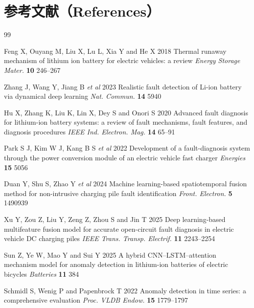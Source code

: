 \documentclass[12pt]{iopjournal}
\begin{document}

\section*{参考文献（References）}
\begingroup
\renewcommand{\section}[2]{}
\begin{thebibliography}{99}
\footnotesize
\setlength{\itemsep}{1pt}

 Feng X, Ouyang M, Liu X, Lu L, Xia Y and He X 2018 Thermal runaway mechanism of lithium ion battery for electric vehicles: a review \textit{Energy Storage Mater.} \textbf{10} 246--267

 Zhang J, Wang Y, Jiang B \textit{et al} 2023 Realistic fault detection of Li-ion battery via dynamical deep learning \textit{Nat. Commun.} \textbf{14} 5940

 Hu X, Zhang K, Liu K, Lin X, Dey S and Onori S 2020 Advanced fault diagnosis for lithium-ion battery systems: a review of fault mechanisms, fault features, and diagnosis procedures \textit{IEEE Ind. Electron. Mag.} \textbf{14} 65--91

 Park S J, Kim W J, Kang B S \textit{et al} 2022 Development of a fault-diagnosis system through the power conversion module of an electric vehicle fast charger \textit{Energies} \textbf{15} 5056

 Duan Y, Shu S, Zhao Y \textit{et al} 2024 Machine learning-based spatiotemporal fusion method for non-intrusive charging pile fault identification \textit{Front. Electron.} \textbf{5} 1490939

 Xu Y, Zou Z, Liu Y, Zeng Z, Zhou S and Jin T 2025 Deep learning-based multifeature fusion model for accurate open-circuit fault diagnosis in electric vehicle DC charging piles \textit{IEEE Trans. Transp. Electrif.} \textbf{11} 2243--2254

 Sun Z, Ye W, Mao Y and Sui Y 2025 A hybrid CNN--LSTM--attention mechanism model for anomaly detection in lithium-ion batteries of electric bicycles \textit{Batteries} \textbf{11} 384

 Schmidl S, Wenig P and Papenbrock T 2022 Anomaly detection in time series: a comprehensive evaluation \textit{Proc. VLDB Endow.} \textbf{15} 1779--1797


\end{thebibliography}
\end{document}
